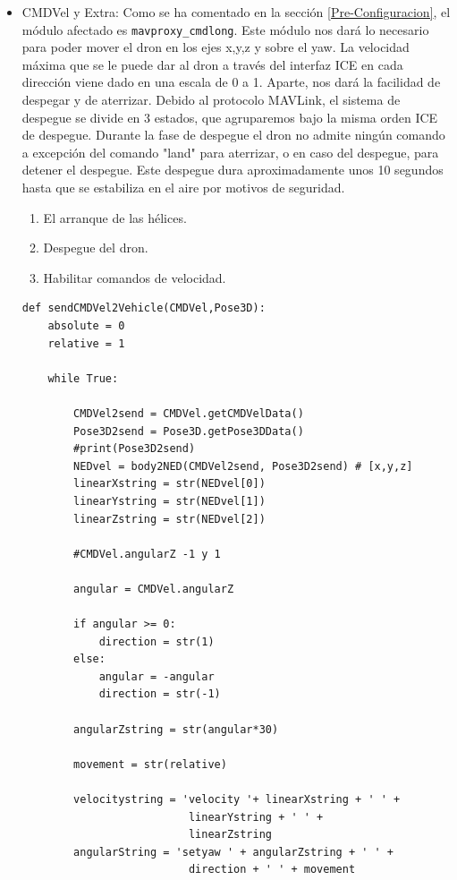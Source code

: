 \begin{itemize}
  \item CMDVel y Extra: Como se ha comentado en la sección \ref{Pre-Configuracion}, el módulo afectado es \texttt{mavproxy\_cmdlong}. Este módulo nos dará lo necesario para poder mover el dron en los ejes x,y,z y sobre el yaw. La velocidad máxima que se le puede dar al dron a través del interfaz ICE en cada dirección viene dado en una escala de 0 a 1. Aparte, nos dará la facilidad de despegar y de aterrizar. Debido al protocolo MAVLink, el sistema de despegue se divide en 3 estados, que agruparemos bajo la misma orden ICE de despegue. Durante la fase de despegue el dron no admite ningún comando a excepción del comando "land" para aterrizar, o en caso del despegue, para detener el despegue.  Este despegue dura aproximadamente unos 10 segundos hasta que se estabiliza en el aire por motivos de seguridad.
  \begin{enumerate}
      \item El arranque de las hélices. 
      \item Despegue del dron.
      \item Habilitar comandos de velocidad.
  \end{enumerate}

\begin{lstlisting}[frame=single]
def sendCMDVel2Vehicle(CMDVel,Pose3D):
    absolute = 0
    relative = 1

    while True:

        CMDVel2send = CMDVel.getCMDVelData()
        Pose3D2send = Pose3D.getPose3DData()
        #print(Pose3D2send)
        NEDvel = body2NED(CMDVel2send, Pose3D2send) # [x,y,z]
        linearXstring = str(NEDvel[0])
        linearYstring = str(NEDvel[1])
        linearZstring = str(NEDvel[2])

        #CMDVel.angularZ -1 y 1

        angular = CMDVel.angularZ

        if angular >= 0:
            direction = str(1)
        else:
            angular = -angular
            direction = str(-1)

        angularZstring = str(angular*30)

        movement = str(relative)

        velocitystring = 'velocity '+ linearXstring + ' ' + 
        				  linearYstring + ' ' + 
                          linearZstring
        angularString = 'setyaw ' + angularZstring + ' ' + 
        				  direction + ' ' + movement


\end{lstlisting}
\end{itemize}
